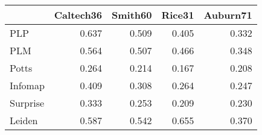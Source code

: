 \begin{tabular}{lrrrr}
\toprule
{} & Caltech36 & Smith60 & Rice31 & Auburn71 \\
\midrule
PLP      &     0.637 &   0.509 &  0.405 &    0.332 \\
PLM      &     0.564 &   0.507 &  0.466 &    0.348 \\
Potts    &     0.264 &   0.214 &  0.167 &    0.208 \\
Infomap  &     0.409 &   0.308 &  0.264 &    0.247 \\
Surprise &     0.333 &   0.253 &  0.209 &    0.230 \\
Leiden   &     0.587 &   0.542 &  0.655 &    0.370 \\
\bottomrule
\end{tabular}
